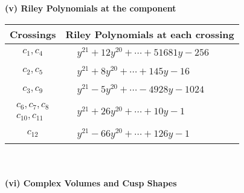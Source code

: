 \documentclass[1p]{elsarticle_modified}
\theoremstyle{definition}
\begin{document}
\newpage\renewcommand{\arraystretch}{1}
\flushleft \textbf{(v) Riley Polynomials at the component}\newline \\
\begin{tabular}{m{50pt}|m{274pt}}
Crossings & \hspace{64pt}Riley Polynomials at each crossing \\
\hline $$\begin{aligned}c_{1},c_{4}\end{aligned}$$&$\begin{aligned}
&y^{21}+12 y^{20}+\cdots+51681 y-256
\end{aligned}$\\
\hline $$\begin{aligned}c_{2},c_{5}\end{aligned}$$&$\begin{aligned}
&y^{21}+8 y^{20}+\cdots+145 y-16
\end{aligned}$\\
\hline $$\begin{aligned}c_{3},c_{9}\end{aligned}$$&$\begin{aligned}
&y^{21}-5 y^{20}+\cdots-4928 y-1024
\end{aligned}$\\
\hline $$\begin{aligned}c_{6},c_{7},c_{8}\\c_{10},c_{11}\end{aligned}$$&$\begin{aligned}
&y^{21}+26 y^{20}+\cdots+10 y-1
\end{aligned}$\\
\hline $$\begin{aligned}c_{12}\end{aligned}$$&$\begin{aligned}
&y^{21}-66 y^{20}+\cdots+126 y-1
\end{aligned}$\\
\hline
\end{tabular}\\~\\
\newpage\flushleft \textbf{(vi) Complex Volumes and Cusp Shapes}
\end{document}
